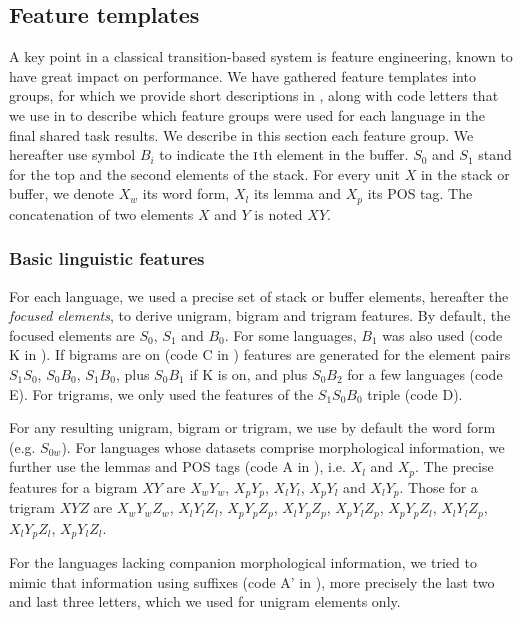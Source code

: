 \documentclass[output=paper,modfonts]{langscibook}
\begin{document}
\subsection{Feature templates}
\label{ss:features}
A key point in a classical transition-based system is feature engineering, known to have great impact on performance. 
We have gathered feature templates into groups, for which we provide short descriptions in , along with code letters that we use in  to describe which feature groups were used for each language in the final shared task results. We describe in this section each feature group. We hereafter use symbol $B_i$ to indicate the $\textsc{i}$th element in the buffer. $S_0$ and $S_1$ stand for the top and the second elements of the stack. For every unit $X$ in the stack or buffer, we denote $X_w$ its word form, $X_l$ its lemma and $X_p$ its POS tag. The concatenation of two elements $X$ and $Y$ is noted $XY$. 
\subsubsection*{Basic linguistic features}
\largerpage[-1]
For each language, we used a precise set of stack or buffer elements, hereafter the {\em focused elements}, to derive unigram, bigram and trigram features. By default, the focused elements are $S_0$, $S_1$ and $B_0$. For some languages, $B_1$ was also used (code K in ). If bigrams are on (code C in ) features are generated for the element pairs $S_1 S_0$, $S_0B_0$, $S_1B_0$, plus $S_0B_1$ if K is on, and plus $S_0B_2$ for a few languages (code E). For trigrams, we only used the features of the $S_1S_0B_0$ triple (code D).

For any resulting unigram, bigram or trigram, we use by default the word form (e.g. $S_{0w}$). For languages whose datasets comprise morphological information, we further use the lemmas and POS tags (code A in ), i.e. $X_l$ and $X_p$. The precise features for a bigram $XY$ are $X_wY_w$, $X_pY_p$, $X_lY_l$, $X_pY_l$ and $X_lY_p$. Those for a trigram $XYZ$ are $X_wY_wZ_w$, $X_lY_lZ_l$, $X_pY_pZ_p$, $X_lY_pZ_p$, $X_pY_lZ_p$, $X_pY_pZ_l$, $X_lY_lZ_p$, $X_lY_pZ_l$, $X_pY_lZ_l$.

For the languages lacking companion morphological information, we tried to mimic that information using suffixes (code A' in ), more precisely the last two and last three letters, which we used for unigram elements only.
\end{document}
